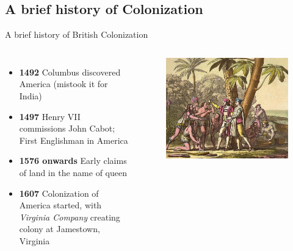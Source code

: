 \documentclass{beamer}
\begin{document}
\subsection{A brief history of Colonization}
\begin{frame}{A brief history of British Colonization}
  \begin{columns}[c]
  \begin{itemize}
  \item \textbf{1492} Columbus discovered America (mistook it for India)
  \item \textbf{1497} Henry VII commissions John Cabot; First Englishman in America
  \item \textbf{1576 onwards} Early claims of land in the name of queen
  \item \textbf{1607} Colonization of America started, with \emph{Virginia Company} creating colony at Jamestown, Virginia
  \end{itemize}
    \begin{figure}[htp]
      \begin{center}
        \centering
        \includegraphics[scale=0.29]{columbus.jpg}
      \end{center}
    \end{figure}
    \end{columns}
\end{frame}
\end{document}

